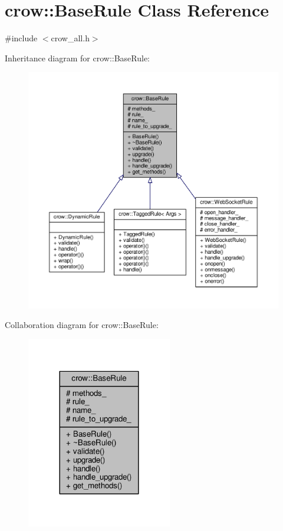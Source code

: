 \hypertarget{classcrow_1_1_base_rule}{\section{crow\-:\-:Base\-Rule Class Reference}
\label{classcrow_1_1_base_rule}
}


{\ttfamily \#include $<$crow\-\_\-all.\-h$>$}



Inheritance diagram for crow\-:\-:Base\-Rule\-:
\nopagebreak
\begin{figure}[H]
\begin{center}
\leavevmode
\includegraphics[width=350pt]{classcrow_1_1_base_rule__inherit__graph}
\end{center}
\end{figure}


Collaboration diagram for crow\-:\-:Base\-Rule\-:
\nopagebreak
\begin{figure}[H]
\begin{center}
\leavevmode
\includegraphics[width=180pt]{classcrow_1_1_base_rule__coll__graph}
\end{center}
\end{figure}
